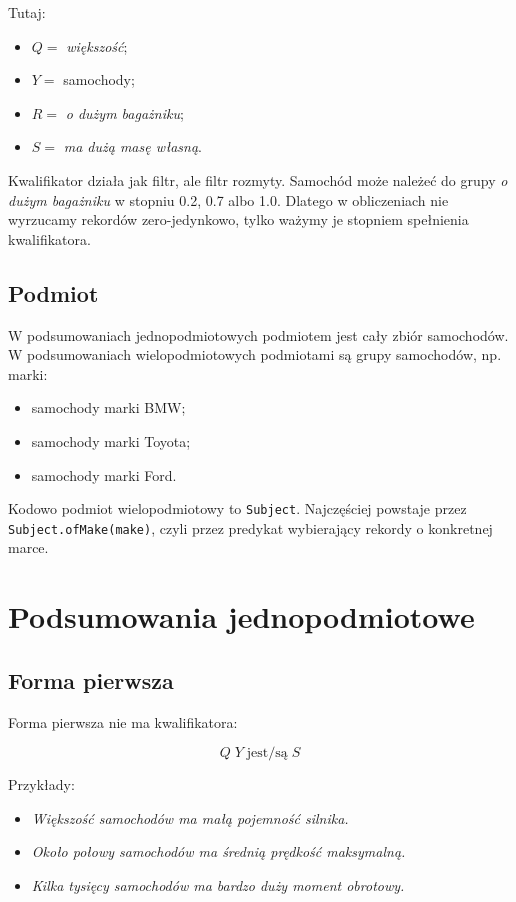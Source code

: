 \documentclass[11pt,a4paper]{article}
\newcommand{\code}[1]{\texttt{#1}}
\begin{document}
Tutaj:

\begin{itemize}
    \item \(Q=\) \emph{większość};
    \item \(Y=\) samochody;
    \item \(R=\) \emph{o dużym bagażniku};
    \item \(S=\) \emph{ma dużą masę własną}.
\end{itemize}

Kwalifikator działa jak filtr, ale filtr rozmyty. Samochód może należeć do grupy \emph{o dużym bagażniku} w stopniu 0.2, 0.7 albo 1.0. Dlatego w obliczeniach nie wyrzucamy rekordów zero-jedynkowo, tylko ważymy je stopniem spełnienia kwalifikatora.

\subsection{Podmiot}

W podsumowaniach jednopodmiotowych podmiotem jest cały zbiór samochodów. W podsumowaniach wielopodmiotowych podmiotami są grupy samochodów, np. marki:

\begin{itemize}
    \item samochody marki BMW;
    \item samochody marki Toyota;
    \item samochody marki Ford.
\end{itemize}

Kodowo podmiot wielopodmiotowy to \code{Subject}. Najczęściej powstaje przez \code{Subject.ofMake(make)}, czyli przez predykat wybierający rekordy o konkretnej marce.

\section{Podsumowania jednopodmiotowe}

\subsection{Forma pierwsza}

Forma pierwsza nie ma kwalifikatora:

\[
Q\;Y\;\text{jest/są}\;S
\]

Przykłady:

\begin{itemize}
    \item \emph{Większość samochodów ma małą pojemność silnika.}
    \item \emph{Około połowy samochodów ma średnią prędkość maksymalną.}
    \item \emph{Kilka tysięcy samochodów ma bardzo duży moment obrotowy.}
\end{itemize}
\end{document}
